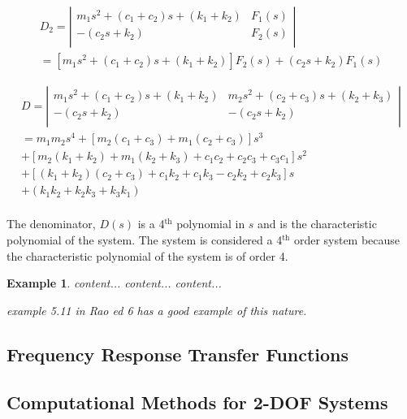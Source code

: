 \documentclass[12pt,letter]{article}
\newtheorem{ex}{Example}
\numberwithin{ex}{section} %
\newenvironment{example}{\begin{mdframed}[middlelinewidth=0.5mm]\begin{ex}\normalfont}{\end{ex}\end{mdframed}}
\numberwithin{re}{section} %
\newcommand{\rd}[1]{\textcolor[rgb]{0.75,0.00,0.00}{#1}}
\begin{document}
\begin{eqnarray}
D_2 = \left|
\begin{array}{cc}
m_1 s^2 + (c_1 + c_2)s + (k_1+k_2)  & F_1(s) \\
-(c_2s+k_2)  & F_2(s) \\
\end{array}
\right| \\
= [m_1 s^2 + (c_1 + c_2)s + (k_1+k_2)]F_2(s) + (c_2s+k_2)F_1(s)  \nonumber
\end{eqnarray}

\begin{eqnarray}
D = \left|
\begin{array}{cc}
m_1 s^2 + (c_1 + c_2)s + (k_1+k_2) & m_2 s^2 + (c_2 + c_3)s + (k_2+k_3) \\
-(c_2s+k_2) & -(c_2s+k_2) \\
\end{array}
\right| \\ \nonumber
= m_1m_2s^4 + [m_2(c_1+c_3)+m_1(c_2+c_3)]s^3 \\  \nonumber
+ [m_2(k_1+k_2)+m_1(k_2+k_3)+c_1c_2+c_2c_3+c_3c_1]s^2 \\  \nonumber
+ [(k_1+k_2)(c_2+c_3)+c_1k_2+c_1k_3-c_2k_2+c_2k_3]s \\  \nonumber
+ (k_1k_2 + k_2k_3 + k_3k_1) \\  \nonumber
\end{eqnarray}

The denominator, $D(s)$ is a 4$^{\text{th}}$ polynomial in $s$ and is the characteristic polynomial of the system. The system is considered a 4$^{\text{th}}$ order system because the characteristic polynomial of the system is of order 4. 

\begin{example}
content...
content...
content...

\rd{example 5.11 in Rao ed 6 has a good example of this nature.}
\end{example}

\subsection{Frequency Response Transfer Functions}



\subsection{Computational Methods for 2-DOF Systems}
\end{document}
